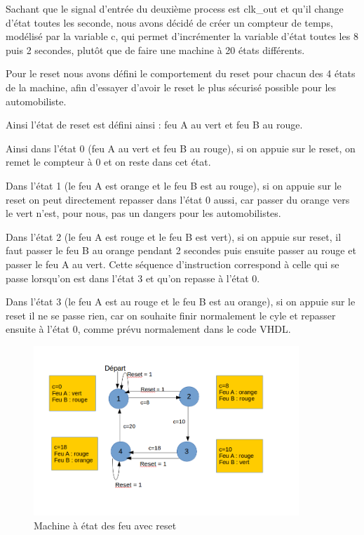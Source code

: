 \documentclass[11pt]{report}
\begin{document}
Sachant que le signal d'entrée du deuxième process est clk\_out et qu'il change d'état toutes les seconde, nous avons décidé de créer un compteur de temps, modélisé par la variable c, qui permet d'incrémenter la variable d'état toutes les 8 puis 2 secondes, plutôt que de faire une machine à 20 états différents.

Pour le reset nous avons défini le comportement du reset pour chacun des 4 états de la machine, afin d'essayer d'avoir le reset le plus sécurisé possible pour les automobiliste.

Ainsi l'état de reset est défini ainsi : feu A au vert et feu B au rouge.

Ainsi dans l'état 0 (feu A au vert et feu B au rouge), si on appuie sur le reset, on remet le compteur à 0 et on reste dans cet état.

Dans l'état 1 (le feu A est orange et le feu B est au rouge), si on appuie sur le reset on peut directement repasser dans l'état 0 aussi, car passer du orange vers le vert n'est, pour nous, pas un dangers pour les automobilistes.

Dans l'état 2 (le feu A est rouge et le feu B est vert), si on appuie sur reset, il faut passer le feu B au orange pendant 2 secondes puis ensuite passer au rouge et passer le feu A au vert. Cette séquence d'instruction correspond à celle qui se passe lorsqu'on est dans l'état 3 et qu'on repasse à l'état 0.

Dans l'état 3 (le feu A est au rouge et le feu B est au orange), si on appuie sur le reset il ne se passe rien, car on souhaite finir normalement le cyle et repasser ensuite à l'état 0, comme prévu normalement dans le code VHDL. 

\begin{figure}[h]
\includegraphics[width=10cm]{TP03-2 .png}
\caption{Machine à état des feu avec reset}
\end{figure}
\end{document}
